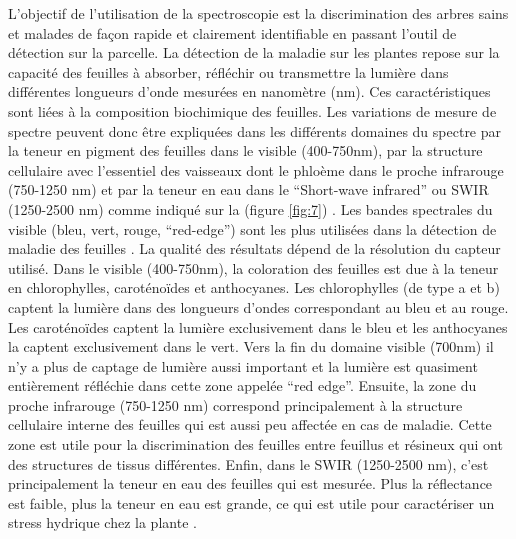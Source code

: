 \documentclass[
  11pt,
  french,
  a4paper,
  extrafontsizes,onecolumn,openright
  ]{memoir}
\begin{document}
L'objectif de l'utilisation de la spectroscopie est la discrimination des arbres sains et malades de façon rapide et clairement identifiable en passant l'outil de détection sur la parcelle. La détection de la maladie sur les plantes repose sur la capacité des feuilles à absorber, réfléchir ou transmettre la lumière dans différentes longueurs d'onde mesurées en nanomètre (nm). Ces caractéristiques sont liées à la composition biochimique des feuilles. Les variations de mesure de spectre peuvent donc être expliquées dans les différents domaines du spectre par la teneur en pigment des feuilles dans le visible (400-750nm), par la structure cellulaire avec l'essentiel des vaisseaux dont le phloème dans le proche infrarouge (750-1250 nm) et par la teneur en eau dans le ``Short-wave infrared'' ou SWIR (1250-2500 nm) comme indiqué sur la (figure \ref{fig:7}) \autocite{comar_etude_2013}. Les bandes spectrales du visible (bleu, vert, rouge, ``red-edge'') sont les plus utilisées dans la détection de maladie des feuilles \autocite{mishra_spectral_2007}. La qualité des résultats dépend de la résolution du capteur utilisé.
Dans le visible (400-750nm), la coloration des feuilles est due à la teneur en chlorophylles, caroténoïdes et anthocyanes. Les chlorophylles (de type a et b) captent la lumière dans des longueurs d'ondes correspondant au bleu et au rouge.
Les caroténoïdes captent la lumière exclusivement dans le bleu et les anthocyanes la captent exclusivement dans le vert. Vers la fin du domaine visible (700nm) il n'y a plus de captage de lumière aussi important et la lumière est quasiment entièrement réfléchie dans cette zone appelée ``red edge''.
Ensuite, la zone du proche infrarouge (750-1250 nm) correspond principalement à la structure cellulaire interne des feuilles qui est aussi peu affectée en cas de maladie. Cette zone est utile pour la discrimination des feuilles entre feuillus et résineux qui ont des structures de tissus différentes.
Enfin, dans le SWIR (1250-2500 nm), c'est principalement la teneur en eau des feuilles qui est mesurée. Plus la réflectance est faible, plus la teneur en eau est grande, ce qui est utile pour caractériser un stress hydrique chez la plante \autocite{albetis_de_la_cruz_potentiel_2018}.

\scriptsize
\end{document}

